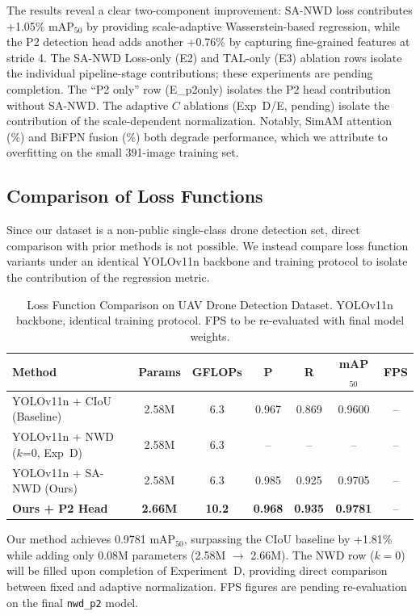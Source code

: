\documentclass[journal]{IEEEtran}
\begin{document}
The results reveal a clear two-component improvement: SA-NWD loss contributes +1.05\% mAP$_{50}$ by providing scale-adaptive Wasserstein-based regression, while the P2 detection head adds another +0.76\% by capturing fine-grained features at stride 4. The SA-NWD Loss-only (E2) and TAL-only (E3) ablation rows isolate the individual pipeline-stage contributions; these experiments are pending completion. The ``P2 only'' row (E\_p2only) isolates the P2 head contribution without SA-NWD. The adaptive $C$ ablations (Exp~D/E, pending) isolate the contribution of the scale-dependent normalization. Notably, SimAM attention (\%) and BiFPN fusion (\%) both degrade performance, which we attribute to overfitting on the small 391-image training set.

\subsection{Comparison of Loss Functions}
\label{sec:comparison}

Since our dataset is a non-public single-class drone detection set, direct comparison with prior methods is not possible. We instead compare loss function variants under an identical YOLOv11n backbone and training protocol to isolate the contribution of the regression metric.

\begin{table}[h]
\centering
\caption{Loss Function Comparison on UAV Drone Detection Dataset. YOLOv11n backbone, identical training protocol. FPS to be re-evaluated with final model weights.}
\label{tab:sota}
\begin{tabular}{lcccccc}
\toprule
\textbf{Method} & \textbf{Params} & \textbf{GFLOPs} & \textbf{P} & \textbf{R} & \textbf{mAP$_{50}$} & \textbf{FPS} \\
\midrule
YOLOv11n + CIoU (Baseline) & 2.58M & 6.3 & 0.967 & 0.869 & 0.9600 & -- \\
YOLOv11n + NWD~\cite{wang2022nwd} ($k$=0, Exp~D) & 2.58M & 6.3 & -- & -- & -- & -- \\
YOLOv11n + SA-NWD (Ours) & 2.58M & 6.3 & 0.985 & 0.925 & 0.9705 & -- \\
\midrule
\textbf{Ours + P2 Head} & \textbf{2.66M} & \textbf{10.2} & \textbf{0.968} & \textbf{0.935} & \textbf{0.9781} & -- \\
\bottomrule
\end{tabular}
\end{table}

Our method achieves 0.9781 mAP$_{50}$, surpassing the CIoU baseline by +1.81\% while adding only 0.08M parameters (2.58M $\to$ 2.66M). The NWD row ($k=0$) will be filled upon completion of Experiment~D, providing direct comparison between fixed and adaptive normalization. FPS figures are pending re-evaluation on the final \texttt{nwd\_p2} model.
\end{document}
